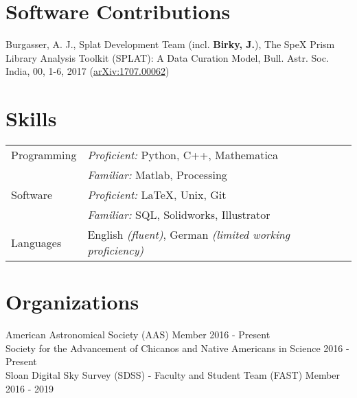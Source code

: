 \documentclass[margin,line]{resume}
\begin{document}
\begin{resume}

\section{\mysidestyle \textcolor{bcolor}{Software Contributions}}
Burgasser, A. J., Splat Development Team (incl. \textbf{Birky, J.}), The SpeX Prism Library Analysis Toolkit (SPLAT): A Data Curation Model, Bull. Astr. Soc. India, 00, 1-6, 2017 (\href{https://arxiv.org/abs/1707.00062}{arXiv:1707.00062})


\section{\mysidestyle \textcolor{bcolor}{Skills}} 

\noindent\begin{tabular}{@{}l|l}
  \multirow{1}{*}{{\sc Programming}} & \textit{Proficient:} Python, C++, Mathematica \\
  	& \textit{Familiar:} Matlab, Processing \vspace{.1cm} \\
  \multirow{1}{*}{{\sc Software}} & \textit{Proficient:} \LaTeX, Unix, Git \\
  	& \textit{Familiar:} SQL, Solidworks, Illustrator  \vspace{.1cm} \\
  \multirow{1}{*}{{\sc Languages}} & English \textit{(fluent)}, German \textit{(limited working proficiency)}
\end{tabular}


\section{\mysidestyle \textcolor{bcolor}{Organizations}}
American Astronomical Society (AAS) Member \hfill 2016 - Present \\
Society for the Advancement of Chicanos and Native Americans in Science \hfill 2016 - Present \\
Sloan Digital Sky Survey (SDSS) - Faculty and Student Team (FAST) Member \hfill 2016 - 2019 



\end{resume}
\end{document}
